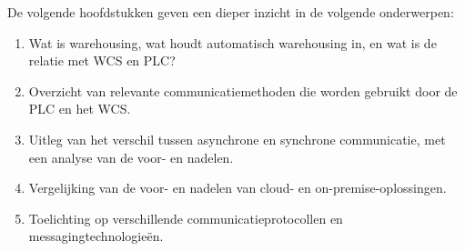 




De volgende hoofdstukken geven een dieper inzicht in de volgende onderwerpen:
\begin{enumerate}
  \item Wat is warehousing, wat houdt automatisch warehousing in, en wat is de relatie met WCS en PLC?
  \item Overzicht van relevante communicatiemethoden die worden gebruikt door de PLC en het WCS.
  \item Uitleg van het verschil tussen asynchrone en synchrone communicatie, met een analyse van de voor- en nadelen.
  \item Vergelijking van de voor- en nadelen van cloud- en on-premise-oplossingen.
  \item Toelichting op verschillende communicatieprotocollen en messagingtechnologieën.
\end{enumerate}

